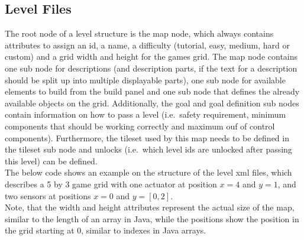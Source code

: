 \subsection{Level Files}\label{subsec:level-files}
The root node of a level structure is the map node, which always contains attributes to assign an id, a name, a difficulty (tutorial, easy, medium, hard or custom) and a
grid width and height for the games grid.
The map node contains one sub node for descriptions (and description parts, if the text for a description should be split up into multiple displayable parts),
one sub node for available elements to build from the build panel and one sub node that defines the already available objects on the grid.
Additionally, the goal and goal definition sub nodes contain information on how to pass a level (i.e.\ safety requirement, minimum components that should be working correctly and
maximum ouf of control components).
Furthermore, the tileset used by this map needs to be defined in the tileset sub node and unlocks (i.e.\ which level ids are unlocked after passing this level) can be defined.
\\
The below code shows an example on the structure of the level xml files, which describes a 5 by 3 game grid with one actuator
at position $x = 4$ and $y = 1$, and two sensors at positions $x = 0$ and $y = [0, 2]$.
\\
Note, that the width and height attributes represent the actual size of the map, similar to the length of an array in Java, while
the positions show the position in the grid starting at 0, similar to indexes in Java arrays.
\\
\\
